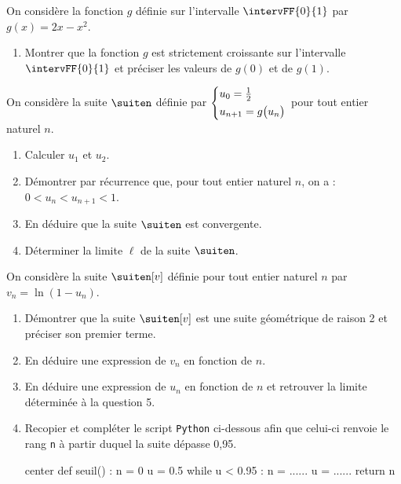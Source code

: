On considère la fonction $g$ définie sur l'intervalle $\intervFF{0}{1}$ par $g(x)= 2x - x^2$.

\begin{enumerate}
	\item Montrer que la fonction $g$ est strictement croissante sur l'intervalle $\intervFF{0}{1}$ et préciser les valeurs de $g(0)$ et de $g(1)$.
\end{enumerate}

On considère la suite $\suiten$ définie par $\begin{dcases} u_0=\tfrac12 \\ u_{n+1}=g\big(u_n\big)\end{dcases}$ pour tout entier naturel $n$.

\begin{enumerate}[resume]
	\item Calculer $u_1$ et $u_2$.
	\item Démontrer par récurrence que, pour tout entier naturel $n$, on a : $0 < u_n < u_{n+1} < 1$.
	\item En déduire que la suite $\suiten$ est convergente.
	\item Déterminer la limite $\ell$ de la suite $\suiten$.
\end{enumerate}

On considère la suite $\suiten[v]$ définie pour tout entier naturel $n$ par $v_n = \ln(1-u_n)$.

\begin{enumerate}[resume]
	\item Démontrer que la suite $\suiten[v]$ est une suite géométrique de raison 2 et préciser son premier terme.
	\item En déduire une expression de $v_n$ en fonction de $n$.
	\item En déduire une expression de $u_n$ en fonction de $n$ et retrouver la limite déterminée à la question 5.
	\item Recopier et compléter le script \texttt{Python} ci-dessous afin que celui-ci renvoie le rang \texttt{n} à partir duquel la suite dépasse 0,95.

\begin{CodePythonLstAlt}[Largeur=0.5\linewidth]{center}
def seuil() :
	n = 0
	u = 0.5
	while u < 0.95 :
		n = ......
		u = ......
	return n
\end{CodePythonLstAlt}
\end{enumerate}